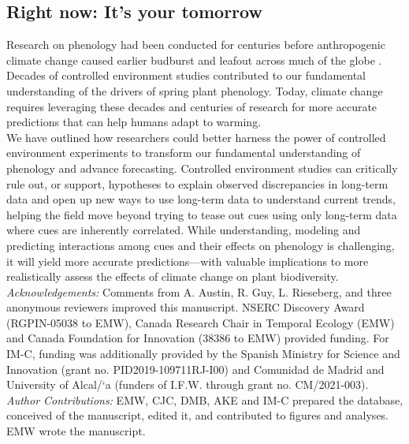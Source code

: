 \documentclass[11pt,letter]{article}
\begin{document}
\subsection{Right now: It's your tomorrow}
Research on phenology had been conducted for centuries before anthropogenic climate change caused earlier budburst and leafout across much of the globe \citep{Lamb:1948aa,Sparks:1995mv}. Decades of controlled environment studies contributed to our fundamental understanding of the drivers of spring plant phenology. Today, climate change requires leveraging these decades and centuries of research for more accurate predictions that can help humans adapt to warming. \\

We have outlined how researchers could better harness the power of controlled environment experiments to transform our fundamental understanding of phenology and advance forecasting. Controlled environment studies can critically rule out, or support, hypotheses to explain observed discrepancies in long-term data and open up new ways to use long-term data to understand current trends, helping the field move beyond trying to tease out cues using only long-term data where cues are inherently correlated. While understanding, modeling and predicting interactions among cues and their effects on phenology is challenging, it will yield more accurate predictions---with valuable implications to more realistically assess the effects of climate change on plant biodiversity.\\

\emph{Acknowledgements:} Comments from A. Austin, R. Guy, L. Rieseberg, and three anonymous reviewers improved this manuscript. NSERC Discovery Award (RGPIN-05038 to EMW), Canada Research Chair in Temporal Ecology (EMW) and Canada Foundation for Innovation (38386 to EMW) provided funding. For IM-C, funding was additionally provided by the Spanish Ministry for Science and Innovation (grant no. PID2019-109711RJ-I00) and Comunidad de Madrid and University of Alcal/`a (funders of I.F.W. through grant no. CM/\BG\/2021-003).\\

\emph{Author Contributions:} EMW, CJC, DMB, AKE and IM-C prepared the database, conceived of the manuscript, edited it, and contributed to figures and analyses. EMW wrote the manuscript.\\

\clearpage
\end{document}
